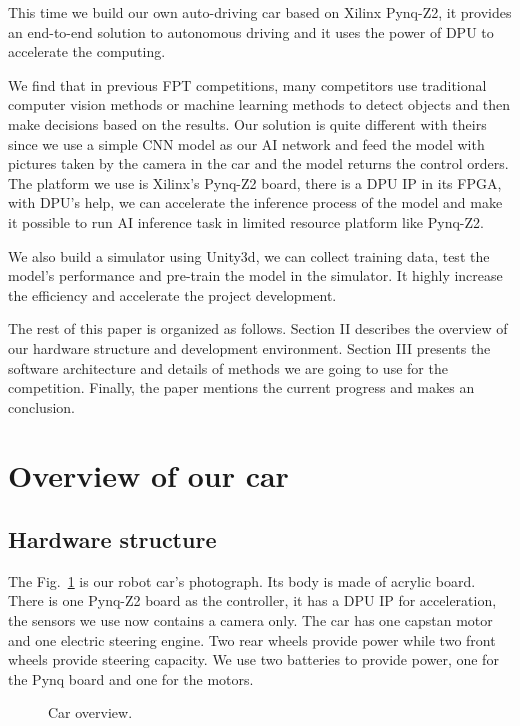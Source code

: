\documentclass[conference]{IEEEtran}
\begin{document}
This time we build our own auto-driving car based on Xilinx Pynq-Z2\cite{b4}, it provides an end-to-end solution to autonomous driving and it uses the power of DPU\cite{b5} to accelerate the computing. 

We find that in previous FPT competitions\cite{b6}, many competitors use traditional computer vision methods or machine learning methods to detect objects and then make decisions based on the results\cite{b7}\cite{b8}. Our solution is quite different with theirs since we use a simple CNN model as our AI network and feed the model with pictures taken by the camera in the car and the model returns the control orders.
The platform we use is Xilinx’s Pynq-Z2 board, there is a DPU IP in its FPGA, with DPU’s help, we can accelerate the inference process of the model and make it possible to run AI inference task in limited resource platform like Pynq-Z2. 

We also build a simulator using Unity3d, we can collect training data, test the model's performance and pre-train the model in the simulator. It highly increase the efficiency and accelerate the project development. 

The rest of this paper is organized as follows. Section II describes the overview of our hardware structure and development environment. Section III presents the software architecture and details of methods we are going to use for the competition. Finally, the paper mentions the current progress and makes an conclusion.

\section{Overview of our car}

\subsection{Hardware structure}

The Fig.~\ref{co} is our robot car's photograph. Its body is made of acrylic board. There is one Pynq-Z2 board as the controller, it has a DPU IP for acceleration, the sensors we use now contains a camera only. The car has one capstan motor and one electric steering engine. Two rear wheels provide power while two front wheels provide steering capacity. We use two batteries to provide power, one for the Pynq board and one for the motors.

\begin{figure}[htbp]
\caption{Car overview.}
\label{co}
\end{figure}
\end{document}
